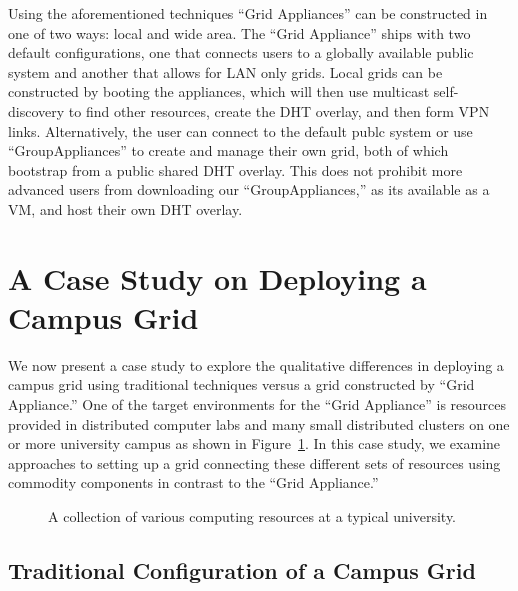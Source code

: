 \documentclass[conference]{IEEEtran}
\begin{document}
Using the aforementioned techniques ``Grid Appliances'' can be constructed in
one of two ways: local and wide area.  The ``Grid Appliance'' ships with two
default configurations, one that connects users to a globally available public
system and another that allows for LAN only grids.  Local grids can be
constructed by booting the appliances, which will then use multicast
self-discovery to find other resources, create the DHT overlay, and then form
VPN links.  Alternatively, the user can connect to the default publc system or
use ``GroupAppliances'' to create and manage their own grid, both of which
bootstrap from a public shared DHT overlay.  This does not prohibit more
advanced users from downloading our ``GroupAppliances,'' as its available as a
VM, and host their own DHT overlay.

\section{A Case Study on Deploying a Campus Grid}
\label{case_study}

We now present a case study to explore the qualitative differences in deploying
a campus grid using traditional techniques versus a grid constructed by ``Grid
Appliance.''  One of the target environments for the ``Grid Appliance'' is
resources provided in distributed computer labs and many small distributed
clusters on one or more university campus as shown in
Figure~\ref{fig:unconnected}.  In this case study, we examine approaches to
setting up a grid connecting these different sets of resources using commodity
components in contrast to the ``Grid Appliance.''

\begin{figure}[ht]
\centering
{}
\caption{A collection of various computing resources at a typical university.}
\label{fig:unconnected}
\end{figure}

\subsection{Traditional Configuration of a Campus Grid}
\end{document}
